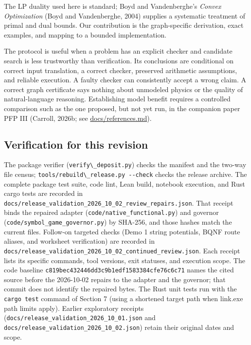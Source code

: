 \documentclass[
  11pt,
]{article}
\newcommand{\passthrough}[1]{#1}
\begin{document}
The LP duality used here is standard; Boyd and Vandenberghe's
\emph{Convex Optimization} (Boyd and Vandenberghe, 2004) supplies a
systematic treatment of primal and dual bounds. Our contribution is the
graph-specific derivation, exact examples, and mapping to a bounded
implementation.

The protocol is useful when a problem has an explicit checker and
candidate search is less trustworthy than verification. Its conclusions
are conditional on correct input translation, a correct checker,
preserved arithmetic assumptions, and reliable execution. A faulty
checker can consistently accept a wrong claim. A correct graph
certificate says nothing about unmodeled physics or the quality of
natural-language reasoning. Establishing model benefit requires a
controlled comparison such as the one proposed, but not yet run, in the
companion paper PFP III (Carroll, 2026b; see
\href{https://github.com/dbccpage/the_symbol_game/blob/main/omega_engine_education/documentation/030_pfp_proposal_fidelity_protocol_pfp/papers/omega_engine_symbol_game/001_pfp_discrete_cochain_retraction_and_toy_involutions/docs/references.md}{docs/references.md}).

\subsection{Verification for this
revision}\label{verification-for-this-revision}

The package verifier (\passthrough{\lstinline!verify\_deposit.py!})
checks the manifest and the two-way file census;
\passthrough{\lstinline!tools/rebuild\_release.py --check!} checks the
release archive. The complete package test suite, code lint, Lean build,
notebook execution, and Rust cargo tests are recorded in
\nolinkurl{docs/release_validation_2026_10_02_review_repairs.json}. That
receipt binds the repaired adapter
(\nolinkurl{code/native_functional.py}) and governor
(\nolinkurl{code/symbol_game_governor.py}) by SHA-256, and those hashes
match the current files. Follow-on targeted checks (Demo 1 string
potentials, BQNF route aliases, and worksheet verification) are recorded
in \nolinkurl{docs/release_validation_2026_10_02_continued_review.json}.
Each receipt lists its specific commands, tool versions, exit statuses,
and execution scope. The code baseline
\nolinkurl{c819bec432446dd3c9b1edf1583384cfe76c6c71} names the cited
source before the 2026-10-02 repairs to the adapter and the governor;
that commit does not identify the repaired bytes. The Rust unit tests
run with the \passthrough{\lstinline!cargo test!} command of Section 7
(using a shortened target path when link.exe path limits apply). Earlier
exploratory receipts
(\nolinkurl{docs/release_validation_2026_10_01.json} and
\nolinkurl{docs/release_validation_2026_10_02.json}) retain their
original dates and scope.
\end{document}

